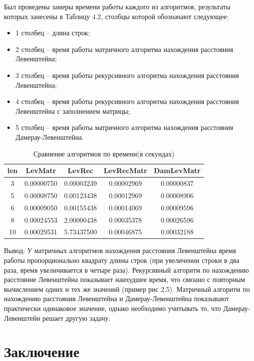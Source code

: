 \documentclass[12pt]{report}
\begin{document}
Был проведены замеры времени работы каждого из алгоритмов, результаты которых занесены в Таблицу 4.2, столбцы которой обозначают следующее: 
\begin{itemize}
	\item 1 столбец – длина строк;
	\item 2 столбец – время работы матричного алгоритма нахождения расстояния Левенштейна;
	\item 3 столбец – время работы рекурсивного алгоритма нахождения расстояния Левенштейна;
	\item 4 столбец – время работы рекурсивного алгоритма нахождения расстояния Левенштейна с заполнением матрицы;
	\item 5 столбец – время работы матричного алгоритма нахождения расстояния Дамерау-Левенштейна.
\end{itemize}
 \newpage
 \begin{table}
	\begin{center}
	\caption{Сравнение алгоритмов по времени(в секундах)}
	\begin{tabular}{|c c c c c|} 
		\hline
		len & LevMatr & LevRec & LevRecMatr & DamLevMatr \\ [0.5ex] 
		\hline\hline
		3 & 0.00000750 & 0.00003239 & 0.00002969 & 0.00000837\\
		\hline
		5 & 0.00008750 & 0.00123438 & 0.00012969  & 0.00008906\\
		\hline
		6 & 0.00009050 & 0.00155438 & 0.00014069  & 0.00009596\\
		\hline
		8 & 0.00024553 & 2.00000438 & 0.00035378  & 0.00026596\\
		\hline
		10 & 0.00029531 & 5.73437500 & 0.00046875 & 0.00032188\\
		\hline
	\end{tabular}
\end{center}
\end{table}

\newpage
 Вывод: У матричных алгоритмов нахождения расстояния Левенштейна время работы пропорционально квадрату длины строк (при увеличении строки в два раза, время увеличивается в четыре раза). Рекурсивный алгоритм по нахождению расстояние Левенштейна показывает наихудшее время, что связано с повторным вычислением одних и тех же значений (пример рис 2.5). Матричный алгоритм по нахождению расстояния Левенштейна и Дамерау-Левенштейна показывают практически одинаковое значение, однако необходимо учитывать то, что Дамерау-Левенштейн решает другую задачу.  

\chapter*{Заключение}
\end{document}

